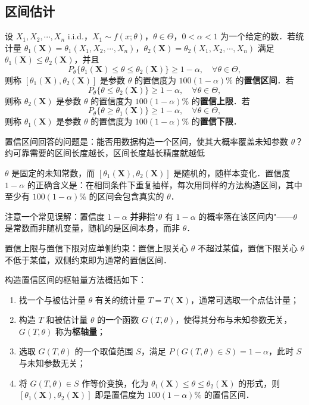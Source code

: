 \subsection{区间估计}
\begin{definition}[置信区间]
设 $X_1, X_2, \cdots, X_n$ i.i.d.，$X_1 \sim f(x;\theta)$，$\theta \in \Theta$，$0 < \alpha < 1$ 为一个给定的数．若统计量 $\theta_1(\boldsymbol{X}) = \theta_1(X_1, X_2, \cdots, X_n)$，$\theta_2(\boldsymbol{X}) = \theta_2(X_1, X_2, \cdots, X_n)$ 满足 $\theta_1(\boldsymbol{X}) \leqslant \theta_2(\boldsymbol{X})$，并且
\[
P_\theta\{\theta_1(\boldsymbol{X}) \leqslant \theta \leqslant \theta_2(\boldsymbol{X})\} \geqslant 1 - \alpha, \quad \forall \theta \in \Theta,
\]
则称 $[\theta_1(\boldsymbol{X}), \theta_2(\boldsymbol{X})]$ 是参数 $\theta$ 的置信度为 $100(1-\alpha)\%$ 的\textbf{置信区间}．若
\[
P_\theta\{\theta \leqslant \theta_2(\boldsymbol{X})\} \geqslant 1 - \alpha, \quad \forall \theta \in \Theta,
\]
则称 $\theta_2(\boldsymbol{X})$ 是参数 $\theta$ 的置信度为 $100(1-\alpha)\%$ 的\textbf{置信上限}．若
\[
P_\theta\{\theta \geqslant \theta_1(\boldsymbol{X})\} \geqslant 1 - \alpha, \quad \forall \theta \in \Theta,
\]
则称 $\theta_1(\boldsymbol{X})$ 是参数 $\theta$ 的置信度为 $100(1-\alpha)\%$ 的\textbf{置信下限}．
\end{definition}
\begin{dxtips}
    置信区间回答的问题是：能否用数据构造一个区间，使其大概率覆盖未知参数 $\theta$？约可靠需要的区间长度越长，区间长度越长精度就越低
\end{dxtips}
\begin{note}


$\theta$ 是固定的未知常数，而 $[\theta_1(\boldsymbol{X}), \theta_2(\boldsymbol{X})]$ 是随机的，随样本变化．置信度 $1-\alpha$ 的正确含义是：在相同条件下重复抽样，每次用同样的方法构造区间，其中至少有 $100(1-\alpha)\%$ 的区间会包含真实的 $\theta$．

注意一个常见误解：置信度 $1-\alpha$ \textbf{并非}指"$\theta$ 有 $1-\alpha$ 的概率落在该区间内"——$\theta$ 是常数而非随机变量，随机的是区间本身，而非 $\theta$．

置信上限与置信下限对应单侧约束：置信上限关心 $\theta$ 不超过某值，置信下限关心 $\theta$ 不低于某值，双侧约束即为通常的置信区间．
\end{note}
\begin{theorem}[枢轴量方法]
构造置信区间的枢轴量方法概括如下：
\begin{enumerate}
    \item 找一个与被估计量 $\theta$ 有关的统计量 $T = T(\boldsymbol{X})$，通常可选取一个点估计量；
    \item 构造 $T$ 和被估计量 $\theta$ 的一个函数 $G(T, \theta)$，使得其分布与未知参数无关，$G(T, \theta)$ 称为\textbf{枢轴量}；
    \item 选取 $G(T, \theta)$ 的一个取值范围 $S$，满足 $P(G(T,\theta) \in S) = 1 - \alpha$，此时 $S$ 与未知参数无关；
    \item 将 $G(T, \theta) \in S$ 作等价变换，化为 $\theta_1(\boldsymbol{X}) \leqslant \theta \leqslant \theta_2(\boldsymbol{X})$ 的形式，则 $[\theta_1(\boldsymbol{X}), \theta_2(\boldsymbol{X})]$ 即是置信度为 $100(1-\alpha)\%$ 的置信区间．
\end{enumerate}
\end{theorem}
